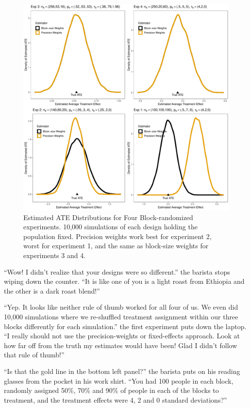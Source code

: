 \documentclass[
]{article}
\begin{document}
\begin{figure}

{\centering \includegraphics[width=0.8\linewidth]{g_all} 

}

\caption{Estimated ATE Distributions for Four Block-randomized experiments. 10,000 simulations of each design holding the population fixed. Precision weights work best for experiment 2, worst for experiment 1, and the same as block-size weights for experiments 3 and 4.}\label{fig:results}
\end{figure}

``Wow! I didn't realize that your designs were so different.'' the barista stops wiping down the counter. ``It is like one of you is a light roast from Ethiopia and the other is a dark roast blend!''

``Yep. It looks like neither rule of thumb worked for all four of us. We even did 10,000 simulations where we re-shuffled treatment assignment within our three blocks differently for each simulation.'' the first experiment puts down the laptop. ``I really should not use the precision-weights or fixed-effects approach. Look at how far off from the truth my estimates would have been! Glad I didn't follow that rule of thumb!''

``Is that the gold line in the bottom left panel?'' the barista puts on his reading glasses from the pocket in his work shirt. ``You had 100 people in each block, randomly assigned 50\%, 70\% and 90\% of people in each of the blocks to treatment, and the treatment effects were 4, 2 and 0 standard deviations?''
\end{document}
